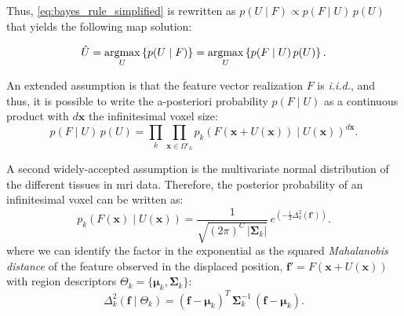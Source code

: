 Thus, \eqref{eq:bayes_rule_simplified} is rewritten as 
$p(U \mid F) \propto p(F \mid U)\, p(U)$ that yields the
following \gls{map} solution:

\begin{equation}
\hat{U} = \underset{U}{\argmax} \left\{ p(U \mid F) \right\} = 
\underset{U}{\argmax} \left\{ p(F \mid U)\, p(U) \right\}.
\label{eq:map_u}
\end{equation}


An extended assumption is that the feature vector realization $F$ is
\emph{i.i.d.}, and thus, it is possible to write the a-posteriori
probability $p(F \mid U)$ as a continuous product with $d\mathbf{x}$ the
infinitesimal voxel size:
\begin{equation}
p(F \mid U) \, p(U) = \underset{k}{\prod} \underset{\mathbf{x}\in \Omega'_k}{\prod}
p_k\left( F(\mathbf{x} + U(\mathbf{x})) \mid U(\mathbf{x}) \right)^{d\mathbf{x}}.
\label{eq:bayes_aposteriori}
\end{equation}

A second widely-accepted assumption is the multivariate normal 
distribution of the different tissues in \gls{mri} data. Therefore,
the posterior probability of an infinitesimal voxel can be written as:
\begin{equation}
p_k( F(\mathbf{x}) \mid U(\mathbf{x}) ) = \frac{1}{ \sqrt{(2\pi)^{C}\,\left|\boldsymbol{\Sigma}_{k}\right|}}\,{e^{\left(-\frac{1}{2}  \Delta^2_k (\mathbf{f}') \right)}}.
\label{eq:bayes_mpdf}
\end{equation}
where we can identify the factor in the exponential as the squared \emph{Mahalanobis 
distance} of the feature observed in the displaced position, $\mathbf{f}' = 
F(\mathbf{x} + U(\mathbf{x}))$ with region descriptors
$\Theta_k = \lbrace \boldsymbol{\mu}_k, \boldsymbol{\Sigma}_k \rbrace$:
\begin{equation}
\Delta^2_k (\mathbf{f} \mid \Theta_k ) = (\mathbf{f} - \boldsymbol{\mu}_k)^T \, \boldsymbol{\Sigma}^{-1}_k \, (\mathbf{f} - \boldsymbol{\mu}_k).
\label{eq:bayes_mahalanobis}
\end{equation}

